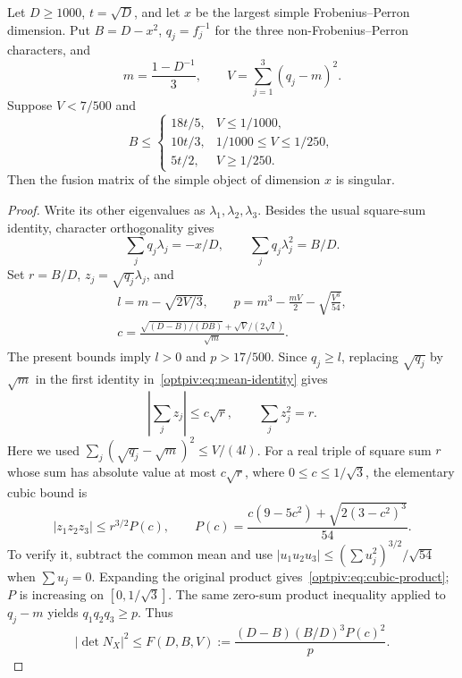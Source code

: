 \begin{lemma}
\label{optpiv:lem:mean-determinant}
Let $D\ge1000$, $t=\sqrt D$, and let $x$ be the largest simple
Frobenius--Perron dimension. Put $B=D-x^2$, $q_j=f_j^{-1}$ for
the three non-Frobenius--Perron characters, and
\[
 m=\frac{1-D^{-1}}3,\qquad V=\sum_{j=1}^3(q_j-m)^2.
\]
Suppose $V<7/500$ and
\[
 B\le\begin{cases}
 18t/5,&V\le1/1000,\\
 10t/3,&1/1000\le V\le1/250,\\
 5t/2,&V\ge1/250.
 \end{cases}
\]
Then the fusion matrix of the simple object of dimension $x$ is singular.
\end{lemma}
\begin{proof}
Write its other eigenvalues as $\lambda_1,\lambda_2,\lambda_3$.
Besides the usual square-sum identity, character orthogonality gives
\begin{equation}\label{optpiv:eq:mean-identity}
 \sum_jq_j\lambda_j=-x/D,\qquad
 \sum_jq_j\lambda_j^2=B/D.
\end{equation}
Set $r=B/D$, $z_j=\sqrt{q_j}\lambda_j$, and
\[
\begin{gathered}
 l=m-\sqrt{2V/3},\qquad
 p=m^3-\frac{mV}{2}-\sqrt{\frac{V^3}{54}},\\
 c=\frac{\sqrt{(D-B)/(DB)}+\sqrt V/(2\sqrt l)}{\sqrt m}.
\end{gathered}
\]
The present bounds imply $l>0$ and $p>17/500$.
Since $q_j\ge l$, replacing $\sqrt{q_j}$ by $\sqrt m$ in the
first identity in~\eqref{optpiv:eq:mean-identity} gives
\[
 \left|\sum_jz_j\right|\le c\sqrt r,
 \qquad \sum_jz_j^2=r.
\]
Here we used
$\sum_j(\sqrt{q_j}-\sqrt m)^2\le V/(4l)$.
For a real triple of square sum $r$ whose sum has absolute value at most
$c\sqrt r$, where $0\le c\le1/\sqrt3$, the elementary cubic bound is
\begin{equation}\label{optpiv:eq:cubic-product}
 |z_1z_2z_3|\le r^{3/2}P(c),\qquad
 P(c)=\frac{c(9-5c^2)+\sqrt{2(3-c^2)^3}}{54}.
\end{equation}
To verify it, subtract the common mean and use
$|u_1u_2u_3|\le(\sum u_j^2)^{3/2}/\sqrt{54}$ when
$\sum u_j=0$. Expanding the original product gives~\eqref{optpiv:eq:cubic-product};
$P$ is increasing on $[0,1/\sqrt3]$.
The same zero-sum product inequality applied to $q_j-m$ yields
$q_1q_2q_3\ge p$. Thus
\begin{equation}\label{optpiv:eq:determinant-comparison}
 |\det N_X|^2\le
 F(D,B,V):=\frac{(D-B)(B/D)^3P(c)^2}{p}.
\end{equation}


\end{proof}
